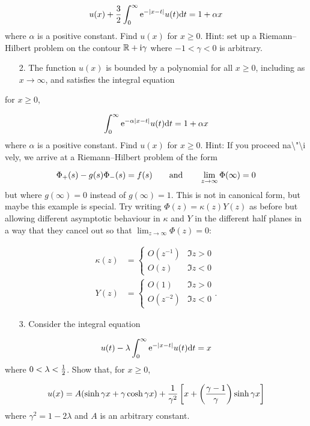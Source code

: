 \documentclass[12pt,a4paper]{article}
\def\qqand{\qquad\hbox{and}\qquad}
\def\D{ {\rm d} }
\def\I{ {\rm i} }
\def\E{ {\rm e} }
\def\R{ {\mathbb R} }
\def\dt{\D t}
\def\pr(#1){\left({#1}\right)}
\def\br[#1]{\left[{#1}\right]}
\def\endash{–}
\begin{document}
\[
      u(x) + {3 \over 2} \int_0^\infty \E^{-|x-t|} u(t)\dt = 1 + \alpha x
\]
where $\alpha$ is a positive constant. Find $u(x)$ for $x \geq 0$. Hint: set up  a Riemann\ensuremath{\endash}Hilbert problem on the contour $\R + \I \gamma$ where $-1 < \gamma < 0$ is arbitrary.

\begin{itemize}
\item[2. ] The function $u(x)$ is bounded by a polynomial for all $x \geq 0$, including as $x \rightarrow \infty$, and satisfies the integral equation

\end{itemize}
for $x \geq 0$,

\[
       \int_0^\infty \E^{-\alpha |x-t|} u(t)\dt = 1 + \alpha x
\]
where $\alpha$ is a positive constant. Find $u(x)$ for $x \geq 0$.  Hint: If you proceed na{\textbackslash}"{\textbackslash}i vely, we arrive at a Riemann\ensuremath{\endash}Hilbert problem of the form

\[
\Phi_+(s) -g(s) \Phi_-(s)  = f(s)     \qqand \lim_{z \rightarrow \infty}\Phi(\infty) = 0
\]
but where $g(\infty) = 0$ instead of $g(\infty) = 1$.  This is not in canonical form, but maybe this example is special. Try writing $\Phi(z) = \kappa(z) Y(z)$ as before but allowing different asymptotic behaviour in $\kappa$ and $Y$ in the different half planes in a way that they cancel out so that $\lim_{z \rightarrow \infty} \Phi(z) = 0$:


\begin{align*}
 \kappa(z) &=  \begin{cases} O(z^{-1}) & \Im z > 0 \\
                             O(z) &  \Im z < 0 \end{cases}  \\
Y(z) &=  \begin{cases}    O(1) & \Im z > 0 \\
                          O(z^{-2}) &  \Im z < 0 \end{cases}.
\end{align*}
\begin{itemize}
\item[3. ] Consider the integral equation

\end{itemize}
\[
       u(t) - \lambda \int_0^\infty \E^{-|x-t|} u(t)\dt =  x
\]
where $0 < \lambda < {1 \over 2}$. Show that, for $x \geq 0$,

\[
	u(x) = A(\sinh \gamma x + \gamma \cosh \gamma x) + {1 \over \gamma^2}\br[x + \pr(\gamma - {1 \over \gamma}) \sinh \gamma x]
\]
where $\gamma^2 = 1 - 2\lambda$ and $A$ is an arbitrary constant.
\end{document}
